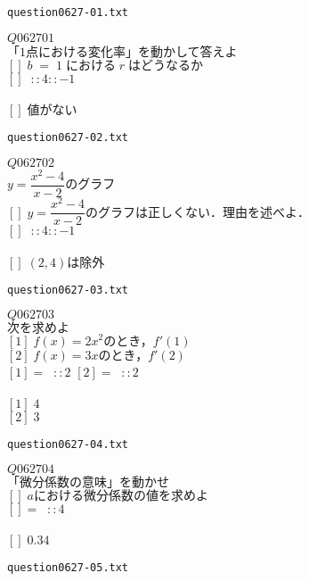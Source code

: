 \documentclass[10pt,dvipdfmx]{jarticle}
\begin{document}
\begin{center}
\verb|question0627-01.txt|\\
\end{center}
$Q062701$\\
$\text{「}1\text{点における変化率」を動かして答えよ}$\\
$[]\;b\;=\;1\;\text{における}\;r\;\text{はどうなるか}$\\
$[]\;\;::4::-1$ 
\\
\\
$[]\;\text{値がない}$\\
\newpage
\begin{center}
\verb|question0627-02.txt|\\
\end{center}
$Q062702$\\
$y=\dfrac{x^2-4}{x-2}\text{のグラフ}$\\
$[]\;y=\dfrac{x^2-4}{x-2}\text{のグラフは正しくない．理由を述べよ．}$\\
$[]\;\;::4::-1$ 
\\
\\
$[]\;(2,4)\text{は除外}$\\
\newpage
\begin{center}
\verb|question0627-03.txt|\\
\end{center}
$Q062703$\\
$\text{次を求めよ}$\\
$[1]\;f(x)=2x^2\text{のとき，}f'(1)$\\
$[2]\;f(x)=3x\text{のとき，}f'(2)$\\
$[1]=\;\;::2$ 
$[2]=\;\;::2$ 
\\
\\
$[1]\;4$\\
$[2]\;3$\\
\newpage
\begin{center}
\verb|question0627-04.txt|\\
\end{center}
$Q062704$\\
$\text{「微分係数の意味」を動かせ}$\\
$[]\;a\text{における微分係数の値を求めよ}$\\
$[]=\;\;::4$ 
\\
\\
$[]\;0.34$\\
\newpage
\begin{center}
\verb|question0627-05.txt|\\
\end{center}
\end{document}
